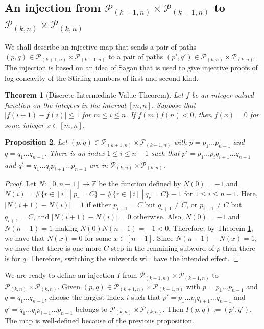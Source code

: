 \documentclass{article}
\newcommand{\lp}{\mathcal{P}}
\newtheorem{theorem}{Theorem}[section]
\newtheorem{proposition}[theorem]{Proposition}
\theoremstyle{definition}
\numberwithin{equation}{section}
\begin{document}
\subsection{An injection from $\lp_{(k+1,n)}\times \lp_{(k-1,n)}$ to $\lp_{(k,n)}\times \lp_{(k,n)}$}
We shall describe an injective map that sends a pair of paths $(p,q)\in \lp_{(k+1,n)}\times \lp_{(k-1,n)}$ to a pair of paths $(p',q')\in \lp_{(k,n)}\times \lp_{(k,n)}$. The injection is based on an idea of Sagan \cite{sagan-log-concave} that is used to give injective proofs of log-concavity of the Stirling numbers of first and second kind. 

\begin{theorem}[Discrete Intermediate Value Theorem]\label{prop: DIVT}
Let $f$ be an integer-valued function on the integers in the interval $[m,n]$. Suppose that $|f(i+1)-f(i)|\le 1$ for $m\le i\le n$. If $f(m)f(n)<0$, then $f(x)=0$ for some integer $x \in [m,n]$.    
\end{theorem}

\begin{proposition}
    Let $(p,q)\in \lp_{(k+1,n)}\times \lp_{(k-1,n)}$ with $p=p_1\dots p_{n-1}$ and $q=q_1\dots q_{n-1}$. There is an index $1\le i\le n-1$ such that $p'=p_1\dots p_i q_{i+1}\dots q_{n-1}$ and $q'=q_1\dots q_i p_{i+1}\dots p_{n-1}$ are in $\lp_{(k,n)}\times \lp_{(k,n)}$.
\end{proposition}
\begin{proof}
Let $N:[0,n-1] \rightarrow \mathbb Z$ be the function defined by $N(0)=-1$ and $N(i)=\#\{ r\in [i]\ |\  p_r=C\} - \#\{ r \in [i]\ |\  q_r=C \}-1$ for $1\le i\le n-1$. Here, $|N(i+1)-N(i)|=1$ if either $p_{i+1}=C$ but $q_{i+1}\neq C$, or $p_{i+1}\neq C$ but $q_{i+1}=C$, and $|N(i+1)-N(i)|=0$ otherwise. Also, $N(0)=-1$ and $N(n-1)=1$ making $N(0)N(n-1)=-1<0$. Therefore, by Theorem \ref{prop: DIVT}, we have that $N(x)=0$ for some $x\in [n-1]$. Since $N(n-1)-N(x)=1$, we have that there is one more $C$ step in the remaining subword of $p$ than there is for $q$. Therefore, switching the subwords will have the intended effect.
\end{proof}
We are ready to define an injection $I$ from $\lp_{(k+1,n)}\times \lp_{(k-1,n)}$ to $\lp_{(k,n)}\times \lp_{(k,n)}$.
Given $(p,q) \in \lp_{(k+1,n)}\times \lp_{(k-1,n)}$ with $p=p_1\dots p_{n-1}$ and $q=q_1\dots q_{n-1}$, choose the largest index $i$ such that $p'=p_1\dots p_i q_{i+1}\dots q_{n-1}$ and $q'=q_1\dots q_i p_{i+1}\dots p_{n-1}$ belongs to $\lp_{(k,n)}\times \lp_{(k,n)}$. Then $I(p,q):=(p',q')$. The map is well-defined because of the previous proposition.
\end{document}
